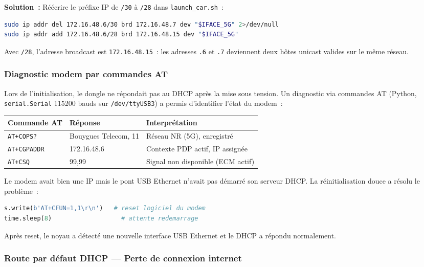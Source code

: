 \documentclass[a4paper,11pt]{article}
\begin{document}
\textbf{Solution~:} Réécrire le préfixe IP de \texttt{/30} à \texttt{/28} dans
\texttt{launch\_car.sh}~:
\begin{lstlisting}[language=bash]
sudo ip addr del 172.16.48.6/30 brd 172.16.48.7 dev "$IFACE_5G" 2>/dev/null
sudo ip addr add 172.16.48.6/28 brd 172.16.48.15 dev "$IFACE_5G"
\end{lstlisting}
Avec \texttt{/28}, l'adresse broadcast est \texttt{172.16.48.15}~: les adresses
\texttt{.6} et \texttt{.7} deviennent deux hôtes unicast valides sur le même réseau.

\subsubsection{Diagnostic modem par commandes AT}

Lors de l'initialisation, le dongle ne répondait pas au DHCP après la mise sous
tension. Un diagnostic via commandes AT (Python, \texttt{serial.Serial} 115200 bauds
sur \texttt{/dev/ttyUSB3}) a permis d'identifier l'état du modem~:

\begin{center}
\begin{tabular}{lll}
\toprule
\textbf{Commande AT} & \textbf{Réponse} & \textbf{Interprétation} \\
\midrule
\texttt{AT+COPS?}   & Bouygues Telecom, 11 & Réseau NR (5G), enregistré \\
\texttt{AT+CGPADDR} & 172.16.48.6          & Contexte PDP actif, IP assignée \\
\texttt{AT+CSQ}     & 99,99                & Signal non disponible (ECM actif) \\
\bottomrule
\end{tabular}
\end{center}

Le modem avait bien une IP mais le pont USB Ethernet n'avait pas démarré son
serveur DHCP. La réinitialisation douce a résolu le problème~:
\begin{lstlisting}[language=python]
s.write(b'AT+CFUN=1,1\r\n')   # reset logiciel du modem
time.sleep(8)                   # attente redemarrage
\end{lstlisting}
Après reset, le noyau a détecté une nouvelle interface USB Ethernet et le DHCP
a répondu normalement.

\subsubsection{Route par défaut DHCP — Perte de connexion internet}
\end{document}
